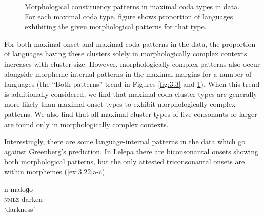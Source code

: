 \begin{figure}
\caption{\label{fig:3.4}Morphological constituency patterns in maximal coda types in data. For each maximal coda type, figure shows proportion of languages exhibiting the given morphological patterns for that type.}
\end{figure}

  For both maximal onset and maximal coda patterns in the data, the proportion of languages having these clusters solely in morphologically complex contexts increases with cluster size. However, morphologically complex patterns also occur alongside morpheme-internal patterns in the maximal margins for a number of languages (the “Both patterns” trend in Figures \ref{fig:3.3} and \ref{fig:3.4}). When this trend is additionally considered, we find that maximal coda cluster types are generally more likely than maximal onset types to exhibit morphologically complex patterns. We also find that all maximal cluster types of five consonants or larger are found only in morphologically complex contexts.

  Interestingly, there are some language-internal patterns in the data which go against Greenberg’s prediction. In Lelepa there are biconsonantal onsets showing both morphological patterns, but the only attested triconsonantal onsets are within morphemes (\ref{ex:3.22}a-c).

\ea\label{ex:3.22}

\ea  n-maloɡo\\
\textsc{nmlz}-darken\\
\glt ‘darkness’

